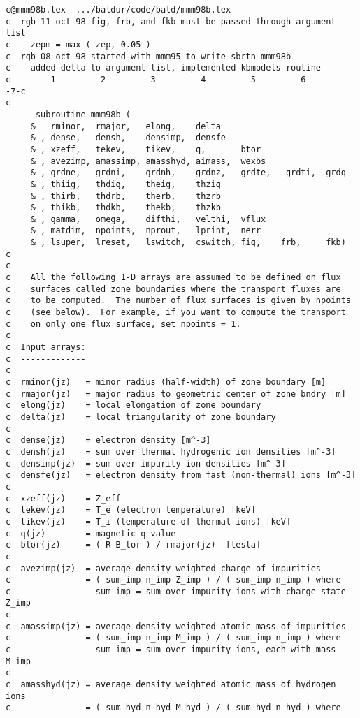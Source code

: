 \begin{verbatim}
c@mmm98b.tex  .../baldur/code/bald/mmm98b.tex
c  rgb 11-oct-98 fig, frb, and fkb must be passed through argument list
c    zepm = max ( zep, 0.05 )
c  rgb 08-oct-98 started with mmm95 to write sbrtn mmm98b
c    added delta to argument list, implemented kbmodels routine
c--------1---------2---------3---------4---------5---------6---------7-c
c
      subroutine mmm98b (
     &   rminor,  rmajor,   elong,    delta
     & , dense,   densh,    densimp,  densfe
     & , xzeff,   tekev,    tikev,    q,       btor
     & , avezimp, amassimp, amasshyd, aimass,  wexbs
     & , grdne,   grdni,    grdnh,    grdnz,   grdte,   grdti,  grdq
     & , thiig,   thdig,    theig,    thzig
     & , thirb,   thdrb,    therb,    thzrb
     & , thikb,   thdkb,    thekb,    thzkb
     & , gamma,   omega,    difthi,   velthi,  vflux
     & , matdim,  npoints,  nprout,   lprint,  nerr
     & , lsuper,  lreset,   lswitch,  cswitch, fig,    frb,     fkb)
c
c
c    All the following 1-D arrays are assumed to be defined on flux
c    surfaces called zone boundaries where the transport fluxes are
c    to be computed.  The number of flux surfaces is given by npoints
c    (see below).  For example, if you want to compute the transport
c    on only one flux surface, set npoints = 1.
c
c  Input arrays:
c  -------------
c
c  rminor(jz)   = minor radius (half-width) of zone boundary [m]
c  rmajor(jz)   = major radius to geometric center of zone bndry [m]
c  elong(jz)    = local elongation of zone boundary
c  delta(jz)    = local triangularity of zone boundary
c
c  dense(jz)    = electron density [m^-3]
c  densh(jz)    = sum over thermal hydrogenic ion densities [m^-3]
c  densimp(jz)  = sum over impurity ion densities [m^-3]
c  densfe(jz)   = electron density from fast (non-thermal) ions [m^-3]
c
c  xzeff(jz)    = Z_eff
c  tekev(jz)    = T_e (electron temperature) [keV] 
c  tikev(jz)    = T_i (temperature of thermal ions) [keV]
c  q(jz)        = magnetic q-value
c  btor(jz)     = ( R B_tor ) / rmajor(jz)  [tesla]
c
c  avezimp(jz)  = average density weighted charge of impurities
c               = ( sum_imp n_imp Z_imp ) / ( sum_imp n_imp ) where
c                 sum_imp = sum over impurity ions with charge state Z_imp
c
c  amassimp(jz) = average density weighted atomic mass of impurities
c               = ( sum_imp n_imp M_imp ) / ( sum_imp n_imp ) where 
c                 sum_imp = sum over impurity ions, each with mass M_imp
c
c  amasshyd(jz) = average density weighted atomic mass of hydrogen ions
c               = ( sum_hyd n_hyd M_hyd ) / ( sum_hyd n_hyd ) where

\end{verbatim}
